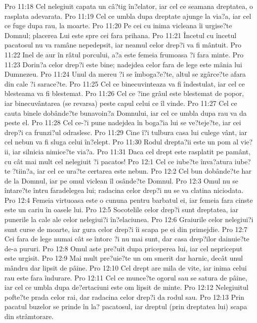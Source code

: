 Pro 11:18  Cel nelegiuit capata un câ?tig în?elator, iar cel ce seamana dreptatea, o rasplata adevarata.
Pro 11:19  Cel ce umbla dupa dreptate ajunge la via?a, iar cel ce fuge dupa rau, la moarte.
Pro 11:20  Pe cei cu inima vicleana îi urgise?te Domnul; placerea Lui este spre cei fara prihana.
Pro 11:21  Încetul cu încetul pacatosul nu va ramâne nepedepsit, iar neamul celor drep?i va fi mântuit.
Pro 11:22  Inel de aur în râtul porcului, a?a este femeia frumoasa ?i fara minte.
Pro 11:23  Dorin?a celor drep?i este bine; nadejdea celor fara de lege este mânia lui Dumnezeu.
Pro 11:24  Unul da mereu ?i se îmboga?e?te, altul se zgârce?te afara din cale ?i sarace?te.
Pro 11:25  Cel ce binecuvinteaza va fi îndestulat, iar cel ce blesteama va fi blestemat.
Pro 11:26  Cel ce ?ine grâul este blestemat de popor, iar binecuvântarea (se revarsa) peste capul celui ce îl vinde.
Pro 11:27  Cel ce cauta binele dobânde?te bunavoin?a Domnului, iar cel ce umbla dupa rau va da peste el.
Pro 11:28  Cel ce-?i pune nadejdea în boga?ia lui se ve?teje?te, iar cei drep?i ca frunzi?ul odraslesc.
Pro 11:29  Cine î?i tulbura casa lui culege vânt, iar cel nebun va fi sluga celui în?elept.
Pro 11:30  Rodul drepta?ii este un pom al vie?ii, iar silnicia nimice?te via?a.
Pro 11:31  Daca cel drept este rasplatit pe pamânt, cu cât mai mult cel nelegiuit ?i pacatos!
Pro 12:1  Cel ce iube?te înva?atura iube?te ?tiin?a, iar cel ce ura?te certarea este nebun.
Pro 12:2  Cel bun dobânde?te har de la Domnul, iar pe omul viclean îl osânde?te Domnul.
Pro 12:3  Omul nu se întare?te întru faradelegea lui; radacina celor drep?i nu se va clatina niciodata.
Pro 12:4  Femeia virtuoasa este o cununa pentru barbatul ei, iar femeia fara cinste este un cariu în oasele lui.
Pro 12:5  Socotelile celor drep?i sunt dreptatea, iar punerile la cale ale celor nelegiui?i în?elaciunea.
Pro 12:6  Graiurile celor nelegiui?i sunt curse de moarte, iar gura celor drep?i îi scapa pe ei din primejdie.
Pro 12:7  Cei fara de lege numai cât se întorc ?i nu mai sunt, dar casa drep?ilor dainuie?te de-a pururi.
Pro 12:8  Omul aste pre?uit dupa priceperea lui, iar cel nepriceput este urgisit.
Pro 12:9  Mai mult pre?uie?te un om smerit dar harnic, decât unul mândru dar lipsit de pâine.
Pro 12:10  Cel drept are mila de vite, iar inima celui rau este fara îndurare.
Pro 12:11  Cel ce munce?te ogorul sau se satura de pâine, iar cel ce umbla dupa de?ertaciuni este om lipsit de minte.
Pro 12:12  Nelegiuitul pofte?te prada celor rai, dar radacina celor drep?i da rodul sau.
Pro 12:13  Prin pacatul buzelor se prinde în la? pacatosul, iar dreptul (prin dreptatea lui) scapa din strâmtorare.
